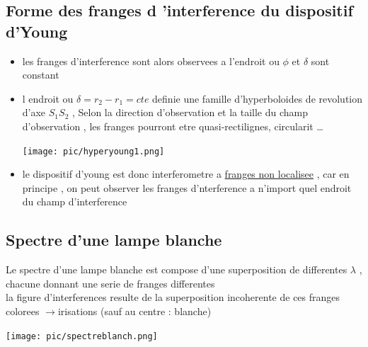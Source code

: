\documentclass[12pt]{book}
\begin{document}
            \subsection{Forme des franges d 'interference du dispositif d'Young}
                \begin{itemize}
                    \item les franges d'interference sont alors observees a l'endroit ou $\phi$ et $\delta$ sont constant 
                    \item 
                        \begin{minipage}{0.49\linewidth}
                            l endroit ou $\delta=r_2-r_1=cte$ definie une famille d'hyperboloides de revolution d'axe $S_1 S_2$ , Selon la direction d'observation et la taille du champ d'observation ,
                        les  franges pourront etre quasi-rectilignes, circularit \ldots
                        \end{minipage}
                        \begin{minipage}{0.49\linewidth}
                            \texttt{[image: pic/hyperyoung1.png]}
                        \end{minipage}
                    \item le dispositif d'young est donc interferometre a \underline{franges non localisee} , car en principe , on peut observer les franges d'nterference a n'import quel endroit du champ d'interference
                \end{itemize}
            \subsection{Spectre d'une lampe blanche}
                \begin{minipage}{0.49\linewidth}
                    Le spectre d'une lampe blanche est compose d'une superposition de differentes $\lambda$ , chacune donnant une serie de franges differentes \\
                    la figure d'interferences resulte de la superposition incoherente de ces franges colorees $\to $irisations (sauf au centre : blanche)
                \end{minipage}
                \begin{minipage}{0.49\linewidth}
                    \texttt{[image: pic/spectreblanch.png]}
                \end{minipage}
\end{document}
